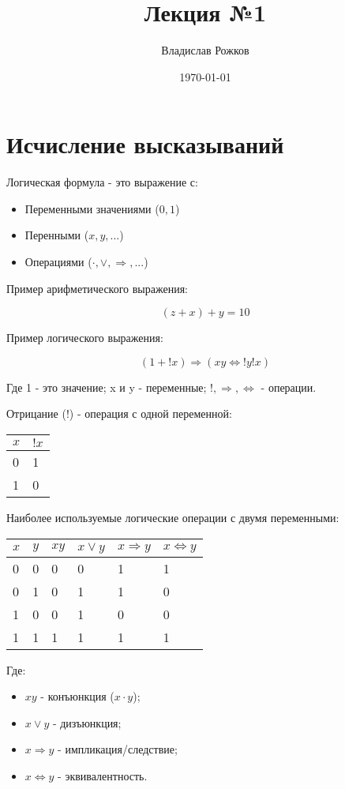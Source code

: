 \documentclass{article}
\begin{document}
	\title{Лекция №1}
	\author{Владислав Рожков}
	\date{\today}
	\maketitle
\section{Исчисление высказываний}
Логическая формула - это выражение с:

\begin{itemize}
	\item Переменными значениями ($0,1$)
	\item Перенными ($x, y, ...$)
	\item Операциями ($\cdot, \vee, \Rightarrow, ...$)
	
\end{itemize}

Пример арифметического выражения: 

\[(z+x)+y=10\]

Пример логического выражения:

\[(1+!x) \Rightarrow (xy \Leftrightarrow !y!x)\]

Где 1 - это значение; x и y - переменные; $!, \Rightarrow, \Leftrightarrow$ - операции.

Отрицание ($!$) - операция с одной переменной:

\begin{table}[h]
	\centering
	\begin{tabular}{ | l | l |}
		\hline
		$x$ & $!x$      \\ \hline
		0 & 1   \\ \hline
		1 & 0  \\ \hline
	\end{tabular}
\end{table}

Наиболее используемые логические операции с двумя переменными:

\begin{table}[h]
	\centering
	\begin{tabular}{ | l | l | l | l | l | l |}
		\hline
		$x$ & $y$ & $xy$  & $x \vee y$  & $x \Rightarrow y$  & $x\Leftrightarrow y$    \\ \hline
		0 & 0 & 0 & 0 & 1 & 1   \\ \hline
		0 & 1 & 0 & 1 & 1 & 0   \\ \hline
		1 & 0 & 0 & 1 & 0 & 0 \\
		\hline
		1 & 1 & 1 & 1 & 1 & 1 \\
		\hline
	\end{tabular}
\end{table}
Где:
\begin{itemize}
	\item $xy$ - конъюнкция ($x \cdot y$); 
	\item $x \vee y$ - дизъюнкция; 
	\item $x \Rightarrow y$ - импликация/следствие; 
	\item $x \Leftrightarrow y$ - эквивалентность.
\end{itemize}
\end{document}

